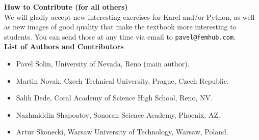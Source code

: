 \documentclass[article,A4,12pt]{llncs}
\begin{document}
{\noindent
{\bf How to Contribute (for all others)}\\[4mm]
\noindent
We will gladly accept new interesting exercises for Karel and/or Python, as well as
new images of good quality that make the textbook more interesting to students. You
can send those at any time via email to {\tt pavel@femhub.com}.\\[4mm]

\newpage
\noindent
{\bf List of Authors and Contributors}
\begin{itemize}
\item Pavel Solin, University of Nevada, Reno (main author). 
\item Martin Novak, Czech Technical University, Prague, Czech Republic.
\item Salih Dede, Coral Academy of Science High School, Reno, NV.
\item Nazhmiddin Shapoatov, Sonoran Science Academy, Phoenix, AZ.
\item Artur Skonecki, Warsaw University of Technology, Warsaw, Poland.
\end{itemize}

%
%
%
}
\vspace{8mm}



\newpage
\setcounter{tocdepth}{2}
\tableofcontents
\end{document}
